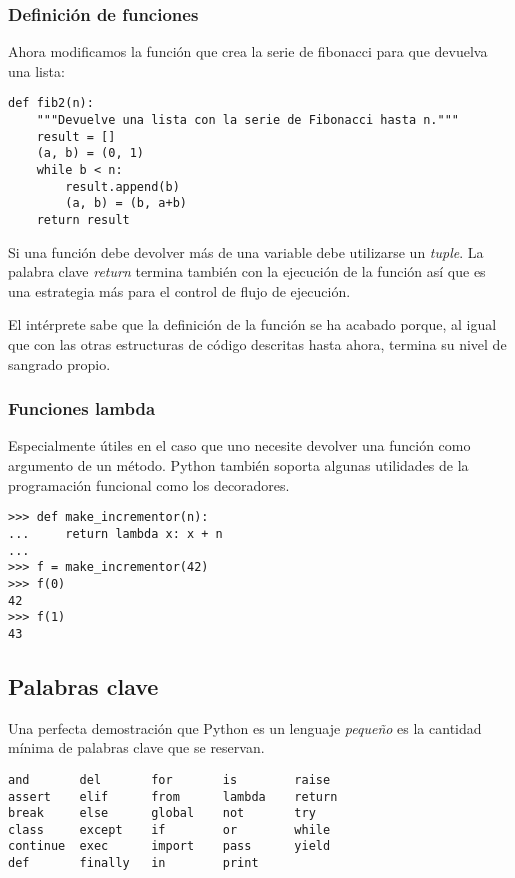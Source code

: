 \documentclass[a4paper,10pt]{article}
\begin{document}
\subsubsection{Definición de funciones}

Ahora modificamos la función que crea la serie de fibonacci para que
devuelva una lista:

\begin{lstlisting}
def fib2(n): 
    """Devuelve una lista con la serie de Fibonacci hasta n."""
    result = []
    (a, b) = (0, 1)
    while b < n:
        result.append(b)
        (a, b) = (b, a+b)
    return result
\end{lstlisting}

Si una función debe devolver más de una variable debe utilizarse un
\emph{tuple}.  La palabra clave \emph{return} termina también con la
ejecución de la función así que es una estrategia más para el control
de flujo de ejecución.

El intérprete sabe que la definición de la función se ha acabado
porque, al igual que con las otras estructuras de código descritas
hasta ahora, termina su nivel de sangrado propio.

\subsubsection{Funciones lambda}


Especialmente útiles en el caso que uno necesite devolver una función
como argumento de un método.  Python también soporta algunas
utilidades de la programación funcional como los decoradores.
\begin{lstlisting}
>>> def make_incrementor(n):
...     return lambda x: x + n
...
>>> f = make_incrementor(42)
>>> f(0)
42
>>> f(1)
43
\end{lstlisting}

\subsection{Palabras clave}

Una perfecta demostración que Python es un lenguaje \emph{pequeño} es
la cantidad mínima de palabras clave que se reservan.

\begin{lstlisting}
and       del       for       is        raise    
assert    elif      from      lambda    return   
break     else      global    not       try      
class     except    if        or        while    
continue  exec      import    pass      yield    
def       finally   in        print
\end{lstlisting}
\end{document}
